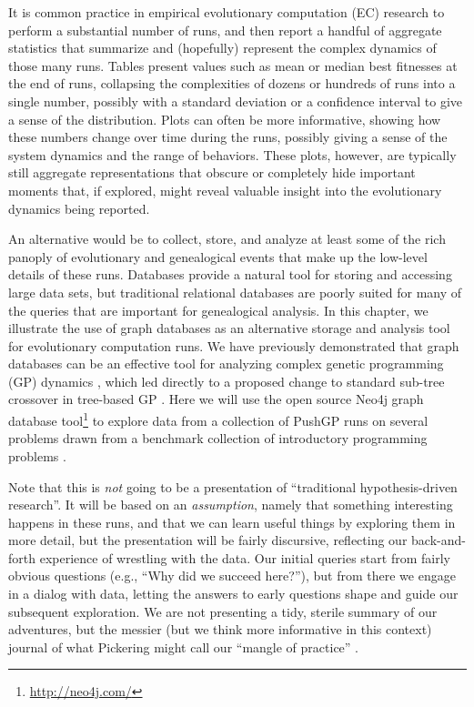 It is common practice in empirical evolutionary computation (EC) 
research to perform a substantial number of runs, and then 
report a handful of aggregate statistics that summarize and (hopefully) represent 
the complex dynamics of those many runs. Tables present values such 
as mean or median best fitnesses at the end of runs, collapsing the complexities of dozens or 
hundreds of runs into a single number, possibly with a standard deviation or a 
confidence interval to give a sense of the distribution. Plots can often be more informative, 
showing how these numbers change over time during the runs, possibly giving a sense of 
the system dynamics and the range of behaviors. These plots, however, are typically still aggregate representations
that obscure or completely hide important moments that, if explored, might reveal valuable insight into the 
evolutionary dynamics being reported.

An alternative would be to collect, store, and analyze at least some of the rich panoply of 
evolutionary and genealogical events that make up the low-level details of these runs. 
Databases provide a natural tool for 
storing and accessing large data sets, but traditional relational
databases are poorly suited for many of the queries that are important for genealogical analysis.
In this chapter, we illustrate the use of graph databases as an alternative storage and analysis tool for
evolutionary computation runs. We have previously demonstrated that graph databases
can be an effective tool for analyzing complex genetic programming (GP) dynamics \citep{donatuccianalysis}, which led directly
to a proposed change to standard sub-tree crossover in tree-based GP \citep{mcphee:GECCO15}.
Here we will use the open source Neo4j graph database tool\footnote{\url{http://neo4j.com/}} 
to explore data from a
collection of PushGP runs \citep{Helmuth:2015:GPTP} on several problems drawn from a benchmark collection of introductory 
programming problems \citep{Helmuth:2015:GECCO}.

Note that this is \emph{not} going to be a presentation of ``traditional hypothesis-driven 
research''. It will be based on an \emph{assumption}, namely that something interesting happens in
these runs, and that we can learn useful things by exploring them in more detail, but the presentation
will be fairly discursive, reflecting our back-and-forth experience of wrestling with the data. Our
initial queries start from fairly obvious questions (e.g., ``Why did we succeed here?''), but from
there we engage in a dialog with data, letting the answers to early questions shape and guide our 
subsequent exploration. We are not presenting a tidy, sterile summary of our adventures, but
the messier (but we think more informative in this context) journal of what Pickering might call
our ``mangle of practice'' \citep{smith2008mangle, pickering:AJS:1993}.

